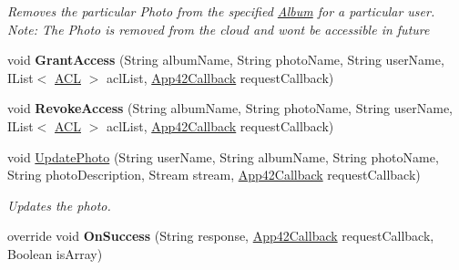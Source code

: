 \begin{DoxyCompactItemize}
\begin{DoxyCompactList}\small\item\em Removes the particular Photo from the specified \hyperlink{classcom_1_1shephertz_1_1app42_1_1paas_1_1sdk_1_1windows_1_1gallery_1_1_album}{Album} for a particular user. Note\+: The Photo is removed from the cloud and wont be accessible in future \end{DoxyCompactList}\item 
\hypertarget{classcom_1_1shephertz_1_1app42_1_1paas_1_1sdk_1_1windows_1_1gallery_1_1_photo_service_a8218bc80b6050669fa8e21f7693bdf28}{void {\bfseries Grant\+Access} (String album\+Name, String photo\+Name, String user\+Name, I\+List$<$ \hyperlink{classcom_1_1shephertz_1_1app42_1_1paas_1_1sdk_1_1windows_1_1_a_c_l}{A\+C\+L} $>$ acl\+List, \hyperlink{interfacecom_1_1shephertz_1_1app42_1_1paas_1_1sdk_1_1windows_1_1_app42_callback}{App42\+Callback} request\+Callback)}\label{classcom_1_1shephertz_1_1app42_1_1paas_1_1sdk_1_1windows_1_1gallery_1_1_photo_service_a8218bc80b6050669fa8e21f7693bdf28}

\item 
\hypertarget{classcom_1_1shephertz_1_1app42_1_1paas_1_1sdk_1_1windows_1_1gallery_1_1_photo_service_a1a92670e2303bb93b7d6f42dd7da3242}{void {\bfseries Revoke\+Access} (String album\+Name, String photo\+Name, String user\+Name, I\+List$<$ \hyperlink{classcom_1_1shephertz_1_1app42_1_1paas_1_1sdk_1_1windows_1_1_a_c_l}{A\+C\+L} $>$ acl\+List, \hyperlink{interfacecom_1_1shephertz_1_1app42_1_1paas_1_1sdk_1_1windows_1_1_app42_callback}{App42\+Callback} request\+Callback)}\label{classcom_1_1shephertz_1_1app42_1_1paas_1_1sdk_1_1windows_1_1gallery_1_1_photo_service_a1a92670e2303bb93b7d6f42dd7da3242}

\item 
void \hyperlink{classcom_1_1shephertz_1_1app42_1_1paas_1_1sdk_1_1windows_1_1gallery_1_1_photo_service_adf32f5ddcbc50a47a4431da1fd56872c}{Update\+Photo} (String user\+Name, String album\+Name, String photo\+Name, String photo\+Description, Stream stream, \hyperlink{interfacecom_1_1shephertz_1_1app42_1_1paas_1_1sdk_1_1windows_1_1_app42_callback}{App42\+Callback} request\+Callback)
\begin{DoxyCompactList}\small\item\em Updates the photo. \end{DoxyCompactList}\item 
\hypertarget{classcom_1_1shephertz_1_1app42_1_1paas_1_1sdk_1_1windows_1_1gallery_1_1_photo_service_adee502dea7adb25320dded6e6bb832cf}{override void {\bfseries On\+Success} (String response, \hyperlink{interfacecom_1_1shephertz_1_1app42_1_1paas_1_1sdk_1_1windows_1_1_app42_callback}{App42\+Callback} request\+Callback, Boolean is\+Array)}\label{classcom_1_1shephertz_1_1app42_1_1paas_1_1sdk_1_1windows_1_1gallery_1_1_photo_service_adee502dea7adb25320dded6e6bb832cf}


\end{DoxyCompactItemize}
